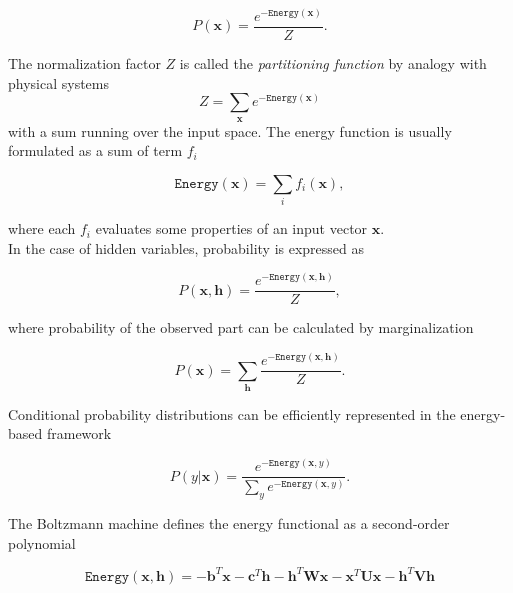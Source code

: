 \begin{equation}
	P(\mathbf{x}) = \frac{e^{-\mathtt{Energy}(\mathbf{x})}}{Z}.
\end{equation}

The normalization factor $Z$ is called the \textit{partitioning function} by analogy with physical systems
\begin{equation}
	Z = \sum_{\mathbf{x}}e^{-\mathtt{Energy}(\mathbf{x})}
\end{equation}
 with a sum running over the input space. The energy function is usually formulated as a sum of term $f_i$
 
 \begin{equation}
 	\mathtt{Energy}(\mathbf{x}) = \sum_i f_i(\mathbf{x}),
 \end{equation}
 
 where each $f_i$ evaluates some properties of an input vector $\mathbf{x}$. \\
 
 In the case of hidden variables, probability is expressed as 
 
 \begin{equation}
	P(\mathbf{x}, \mathbf{h}) = \frac{e^{-\mathtt{Energy}(\mathbf{x}, \mathbf{h})}}{Z},
\end{equation}
 
 where probability of the observed part can be calculated by marginalization
 
 \begin{equation}
	P(\mathbf{x}) = \sum_{\mathbf{h}}\frac{e^{-\mathtt{Energy}(\mathbf{x}, \mathbf{h})}}{Z}.
\end{equation}

Conditional probability distributions can be efficiently represented in the energy-based framework

\begin{equation}
	P(y| \mathbf{x}) = \frac{e^{-\mathtt{Energy}(\mathbf{x},y)}}{\sum_y e^{-\mathtt{Energy}(\mathbf{x},y)}}.
\end{equation}

The Boltzmann machine defines the energy functional as a second-order polynomial

\begin{equation}
	\mathtt{Energy}(\mathbf{x}, \mathbf{h}) = -\mathbf{b}^T\mathbf{x} - \mathbf{c}^T\mathbf{h} - \mathbf{h}^T\mathbf{W}\mathbf{x} - \mathbf{x}^T\mathbf{U}\mathbf{x} - \mathbf{h}^T\mathbf{V}\mathbf{h}
	\label{eq:BoltzmannEnergy}
\end{equation}

